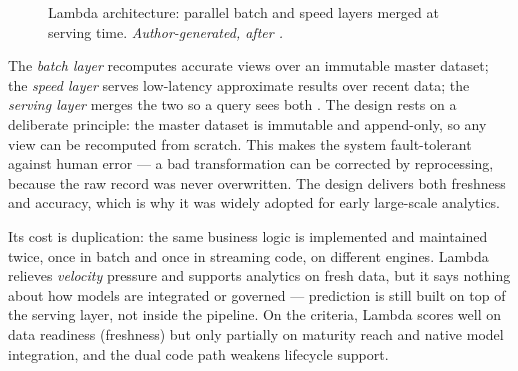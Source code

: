 \begin{figure}[H]
\centering
{}
\caption{Lambda architecture: parallel batch and speed layers merged at serving time. \textit{Author-generated, after \parencite{marz2015}.}}
\label{fig:ch2-lambda}
\end{figure}

The \textit{batch layer} recomputes accurate views over an immutable master dataset; the \textit{speed layer} serves low-latency approximate results over recent data; the \textit{serving layer} merges the two so a query sees both \parencite{marz2015}. The design rests on a deliberate principle: the master dataset is immutable and append-only, so any view can be recomputed from scratch. This makes the system fault-tolerant against human error --- a bad transformation can be corrected by reprocessing, because the raw record was never overwritten. The design delivers both freshness and accuracy, which is why it was widely adopted for early large-scale analytics.

Its cost is duplication: the same business logic is implemented and maintained twice, once in batch and once in streaming code, on different engines. Lambda relieves \textit{velocity} pressure and supports analytics on fresh data, but it says nothing about how models are integrated or governed --- prediction is still built on top of the serving layer, not inside the pipeline. On the criteria, Lambda scores well on data readiness (freshness) but only partially on maturity reach and native model integration, and the dual code path weakens lifecycle support.

